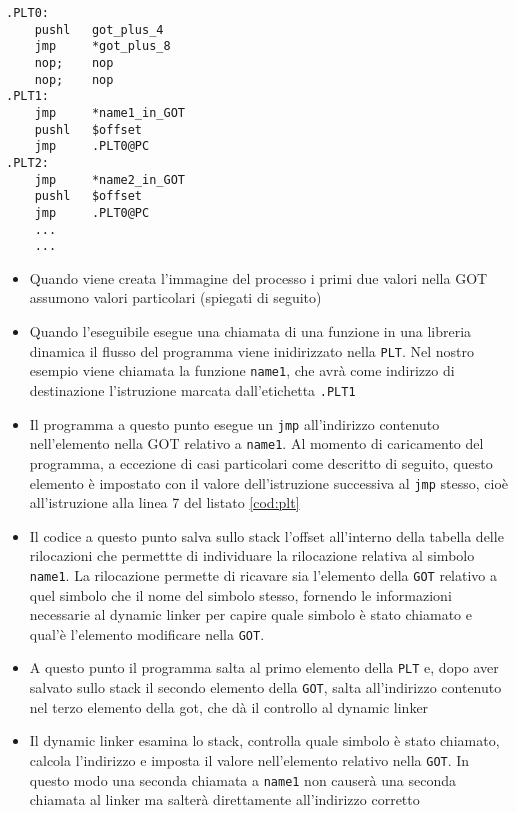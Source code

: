 \begin{lstlisting}[caption=Procedure linkage table, label=cod:plt]
.PLT0:
    pushl   got_plus_4
    jmp     *got_plus_8
    nop;    nop
    nop;    nop
.PLT1:
    jmp     *name1_in_GOT
    pushl   $offset
    jmp     .PLT0@PC
.PLT2:
    jmp     *name2_in_GOT
    pushl   $offset
    jmp     .PLT0@PC
    ...
    ...
\end{lstlisting}

\begin{itemize}
\item Quando viene creata l'immagine del processo i primi due valori
  nella GOT assumono valori particolari (spiegati di seguito)
\item Quando l'eseguibile esegue una chiamata di una funzione in una
  libreria dinamica il flusso del programma viene inidirizzato nella
  \lstinline{PLT}. Nel nostro esempio viene chiamata la funzione
  \lstinline{name1}, che avrà come indirizzo di destinazione
  l'istruzione marcata dall'etichetta \lstinline{.PLT1}
\item Il programma a questo punto esegue un \lstinline{jmp}
  all'indirizzo contenuto nell'elemento nella GOT relativo a
  \lstinline{name1}. Al momento di caricamento del programma, a
  eccezione di casi particolari come descritto di seguito, questo
  elemento è impostato con il valore dell'istruzione successiva al
  \lstinline{jmp} stesso, cioè all'istruzione alla linea 7 del listato
  \ref{cod:plt}
\item Il codice a questo punto salva sullo stack l'offset all'interno
  della tabella delle rilocazioni che permettte di individuare la
  rilocazione relativa al simbolo \lstinline{name1}. La rilocazione
  permette di ricavare sia l'elemento della \lstinline{GOT} relativo a
  quel simbolo che il nome del simbolo stesso, fornendo le
  informazioni necessarie al dynamic linker per capire quale simbolo è
  stato chiamato e qual'è l'elemento modificare nella \lstinline{GOT}.
\item A questo punto il programma salta al primo elemento della
  \lstinline{PLT} e, dopo aver salvato sullo stack il secondo elemento
  della \lstinline{GOT}, salta all'indirizzo contenuto nel terzo
  elemento della got, che dà il controllo al dynamic linker
\item Il dynamic linker esamina lo stack, controlla quale simbolo è
  stato chiamato, calcola l'indirizzo e imposta il valore
  nell'elemento relativo nella \lstinline{GOT}. In questo modo una
  seconda chiamata a \lstinline{name1} non causerà una seconda
  chiamata al linker ma salterà direttamente all'indirizzo corretto
\end{itemize}

